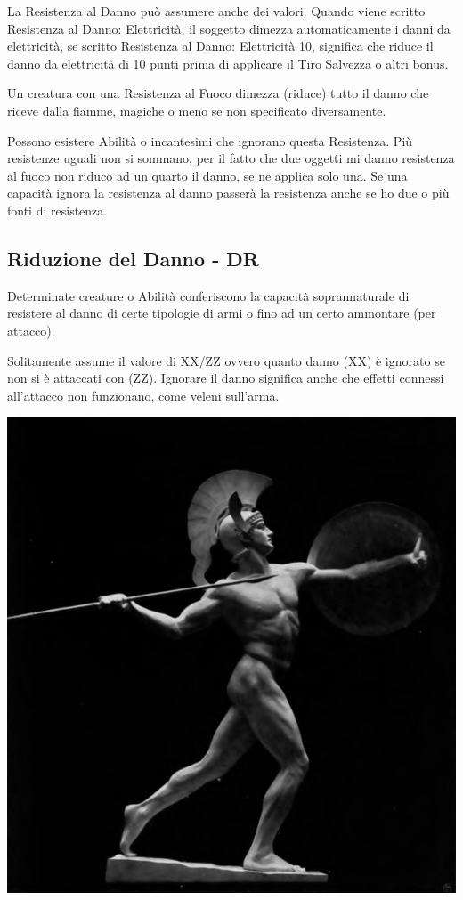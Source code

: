 \begin{multicols}{2}
La Resistenza al Danno può assumere anche dei valori. Quando viene scritto Resistenza al Danno: Elettricità, il soggetto dimezza automaticamente i danni da elettricità, se scritto Resistenza al Danno: Elettricità 10, significa che riduce il danno da elettricità di 10 punti prima di applicare il Tiro Salvezza o altri bonus.

Un creatura con una Resistenza al Fuoco dimezza (riduce) tutto il danno che riceve dalla fiamme, magiche o meno se non specificato diversamente.

Possono esistere Abilità o incantesimi che ignorano questa Resistenza. Più resistenze uguali non si sommano, per il fatto che due oggetti mi danno resistenza al fuoco non riduco ad un quarto il danno, se ne applica solo una.
Se una capacità ignora la resistenza al danno passerà la resistenza anche se ho due o più fonti di resistenza.

\subsection{Riduzione del Danno - DR}\label{resistenzaaldannodr}\hypertarget{riduzionedeldanno}{}

Determinate creature o Abilità conferiscono la capacità soprannaturale di resistere al danno di certe tipologie di armi o fino ad un certo ammontare (per attacco).

Solitamente assume il valore di XX/ZZ ovvero quanto danno (XX) è ignorato se non si è attaccati con (ZZ). Ignorare il danno significa anche che effetti connessi all'attacco non funzionano, come veleni sull'arma.

\begin{center}

\includegraphics[width=0.8\linewidth]{immagini/Archilles_Wilhelm_Wandschneider_grayscale.png}


\end{center}
\end{multicols}
